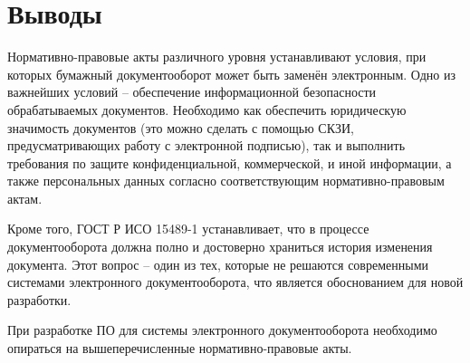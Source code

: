 \section{Выводы} \label{rights_conclusion}

Нормативно-правовые акты различного уровня устанавливают условия, при которых бумажный документооборот может быть заменён электронным. Одно из важнейших условий -- обеспечение информационной безопасности обрабатываемых документов. Необходимо как обеспечить юридическую значимость документов (это можно сделать с помощью СКЗИ, предусматривающих работу с электронной подписью), так и выполнить требования по защите конфиденциальной, коммерческой, и иной информации, а также персональных данных согласно соответствующим нормативно-правовым актам.

Кроме того, ГОСТ Р ИСО 15489-1 устанавливает, что в процессе документооборота должна полно и достоверно храниться история изменения документа. Этот вопрос -- один из тех, которые не решаются современными системами электронного документооборота, что является обоснованием для новой разработки.

\vspace{\baselineskip}
При разработке ПО для системы электронного документооборота необходимо опираться на вышеперечисленные нормативно-правовые акты.